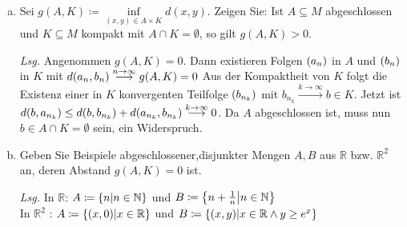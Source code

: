 \documentclass{scrreprt}
\begin{document}
\begin{enumerate}[a)]
\item Sei $g(A, K) \coloneqq \underset{(x, y) \in A \times K}\inf d(x, y)$.
  Zeigen Sie: Ist $A \subseteq M$ abgeschlossen und $K \subseteq M$ kompakt
  mit $A \cap K = \emptyset$, so gilt $g(A, K) > 0$.

  \textit{Lsg.} Angenommen $g(A, K) = 0$.
  Dann existieren Folgen $\qty(a_n)$ in $A$ und $\qty(b_n)$ in $K$
  mit $d\qty(a_n, b_n) \overset{n \to \infty}\longrightarrow g(A, K) = 0$
  Aus der Kompaktheit von $K$ folgt die Existenz einer in $K$
  konvergenten Teilfolge $\qty(b_{n_k})$ mit
  $b_{n_k} \overset{k \to \infty}\longrightarrow b \in K$.
  Jetzt ist $d\qty(b, a_{n_k}) \leq d\qty(b, b_{n_k}) + d(a_{n_k}, b_{n_k})
  \overset{k \to \infty}\longrightarrow 0$.
  Da $A$ abgeschlossen ist, muss nun $b \in A \cap K = \emptyset$ sein,
  ein Widerspruch.

\item Geben Sie Beispiele abgeschlossener,disjunkter Mengen $A, B$ aus
  $\mathbb{R}$ bzw. $\mathbb{R}^2$ an, deren Abstand $g(A, K) = 0$ ist.

  \textit{Lsg.} In $\mathbb{R}$: $A \coloneqq \qty{n \middle| n \in \mathbb{N}}$
  und $B \coloneqq \qty{n + \frac{1}{n} \middle| n \in \mathbb{N}}$ \\
  In $\mathbb{R}^2$ : $A \coloneqq \qty{(x, 0) \middle| x \in \mathbb{R}}$
  und $B \coloneqq \qty{(x, y) \middle| x \in \mathbb{R} \land y \geq e^x}$
\end{enumerate}
\end{document}

